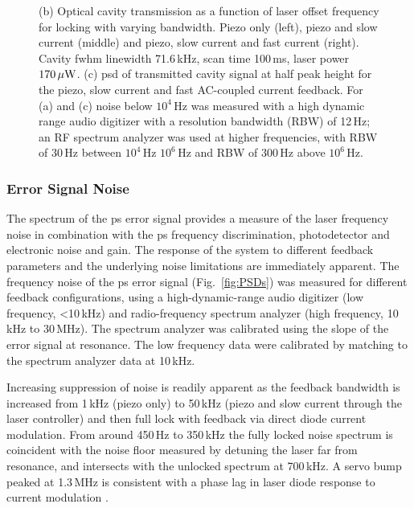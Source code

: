 \begin{figure}[htbp]
{(b) Optical cavity transmission as a function of laser offset frequency for locking with varying bandwidth.
Piezo only (left), piezo and slow current (middle) and piezo, slow current and fast current (right).
Cavity \gls*{fwhm} linewidth 71.6\,kHz, scan time 100\,ms, laser power $170\rm\,\mu W$.
(c) \Gls*{psd} of transmitted cavity signal at half peak height for the piezo, slow current and fast AC-coupled current feedback.
For (a) and (c) noise below $10^4$\,Hz was measured with a high dynamic range audio digitizer with a resolution bandwidth (RBW) of 12\,Hz; an RF spectrum analyzer was used at higher frequencies, with RBW of 30\,Hz between $10^4$\,Hz \textendash$10^6$\,Hz and RBW of 300\,Hz above $10^6$\,Hz.} 
\end{figure}

\subsubsection{Error Signal Noise}
The spectrum of the \gls*{ps} error signal provides a measure of the laser frequency noise in combination with the \gls*{ps} frequency discrimination, photodetector and electronic noise and gain.
The response of the system to different feedback parameters and the underlying noise limitations are immediately apparent.
The frequency noise  of the \gls*{ps} error signal (Fig.~\ref{fig:PSDs}) was measured for different feedback configurations, using a high-dynamic-range audio digitizer (low frequency, \textless10\,kHz) and radio-frequency spectrum analyzer (high frequency, 10\,kHz to 30\,MHz).
The spectrum analyzer was calibrated using the slope of the error signal at resonance.
The low frequency data were calibrated by matching to the spectrum analyzer data at 10\,kHz.  

Increasing suppression of noise is readily apparent as the feedback bandwidth is increased from 1\,kHz (piezo only) to 50\,kHz (piezo and slow current through the laser controller) and then full lock with feedback via direct diode current modulation.
From around 450\,Hz to 350\,kHz the fully locked noise spectrum is coincident with the noise floor measured by detuning the laser far from resonance, and intersects with the unlocked spectrum at 700\,kHz.
A servo bump peaked at 1.3\,MHz is consistent with a phase lag in laser diode response to current modulation \cite{wiemanhollberg}.


